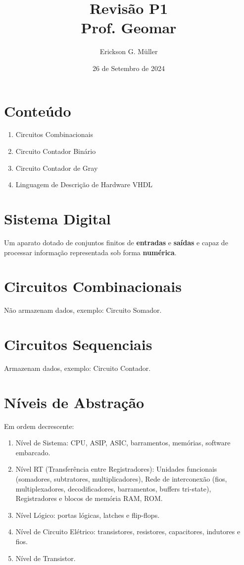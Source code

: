 \documentclass[•]{article}
\title{Revisão P1\\Prof. Geomar}
\date{26 de Setembro de 2024}
\author{Erickson G. Müller}
\begin{document}
	\maketitle
	\section*{Conteúdo}
		\begin{enumerate}
			\item Circuitos Combinacionais
			\item Circuito Contador Binário
			\item Circuito Contador de Gray
			\item Linguagem de Descrição de Hardware VHDL
		\end{enumerate}
	\newpage
	
	\section{Sistema Digital}
		Um aparato dotado de conjuntos finitos de \textbf{entradas} e \textbf{saídas} e capaz de processar informação representada sob forma \textbf{numérica}.
	\section{Circuitos Combinacionais}
		Não armazenam dados, exemplo: Circuito Somador.
	\section{Circuitos Sequenciais}
		Armazenam dados, exemplo: Circuito Contador.
	\section{Níveis de Abstração}
		Em ordem decrescente:
		\begin{enumerate}
			\item Nível de Sistema: CPU, ASIP, ASIC, barramentos, memórias, software embarcado.
			\item Nível RT (Transferência entre Registradores): Unidades funcionais (somadores, subtratores, multiplicadores), Rede de interconexão (fios, multiplexadores, decodificadores, barramentos, buffers tri-state), Registradores e blocos de memória RAM, ROM.
			\item Nível Lógico: portas lógicas, latches e flip-flops.
			\item Nível de Circuito Elétrico: transistores, resistores, capacitores, indutores e fios.
			\item Nível de Transistor.
		\end{enumerate}
\end{document}
